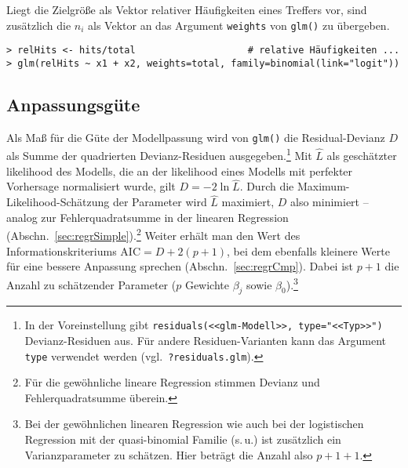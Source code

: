Liegt die Zielgröße als Vektor relativer Häufigkeiten eines Treffers vor, sind zusätzlich die $n_{i}$ als Vektor an das Argument \lstinline!weights! von \lstinline!glm()! zu übergeben.
\begin{lstlisting}
> relHits <- hits/total                    # relative Häufigkeiten ...
> glm(relHits ~ x1 + x2, weights=total, family=binomial(link="logit"))
\end{lstlisting}

\subsection{Anpassungsgüte}
\label{sec:regrLogRsq}

Als Maß für die Güte der Modellpassung wird von \lstinline!glm()! die Residual-Devianz $D$ als Summe der quadrierten Devianz-Residuen ausgegeben.\footnote{In der Voreinstellung gibt \lstinline!residuals(<<glm-Modell>>, type="<<Typ>>")! Devianz-Residuen aus. Für andere Residuen-Varianten kann das Argument \lstinline!type! verwendet werden (vgl.\ \lstinline!?residuals.glm!).} Mit $\hat{L}$ als geschätzter likelihood des Modells, die an der likelihood eines Modells mit perfekter Vorhersage normalisiert wurde, gilt $D = -2 \ln \hat{L}$. Durch die Maximum-Likelihood-Schätzung der Parameter wird $\hat{L}$ maximiert, $D$ also minimiert -- analog zur Fehlerquadratsumme in der linearen Regression (Abschn.\ \ref{sec:regrSimple}).\footnote{Für die gewöhnliche lineare Regression stimmen Devianz und Fehlerquadratsumme überein.} Weiter erhält man den Wert des Informationskriteriums $\text{AIC} = D + 2 (p+1)$, bei dem ebenfalls kleinere Werte für eine bessere Anpassung sprechen (Abschn.\ \ref{sec:regrCmp}). Dabei ist $p+1$ die Anzahl zu schätzender Parameter ($p$ Gewichte $\beta_{j}$ sowie $\beta_{0}$).\footnote{Bei der gewöhnlichen linearen Regression wie auch bei der logistischen Regression mit der quasi-binomial Familie (s.\,u.) ist zusätzlich ein Varianzparameter zu schätzen. Hier beträgt die Anzahl also $p+1+1$.}

